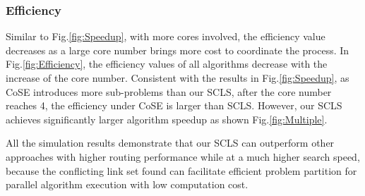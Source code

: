\subsubsection{Efficiency}
Similar to Fig.\ref{fig:Speedup}, with more cores involved, the efficiency value decreases  as a large core number brings more cost to coordinate the process. In Fig.\ref{fig:Efficiency}, the efficiency values of all algorithms decrease with the increase of the core number. Consistent with the results in Fig.\ref{fig:Speedup}, as CoSE introduces more sub-problems than our SCLS, after the core number reaches 4, the efficiency under CoSE is larger than SCLS. However, our SCLS achieves significantly larger algorithm speedup as shown Fig.\ref{fig:Multiple}. %

All the simulation results demonstrate that our SCLS can outperform other approaches with higher routing performance while at a much higher search speed, because the  conflicting link set found can facilitate efficient problem partition for parallel algorithm execution with low computation cost.

